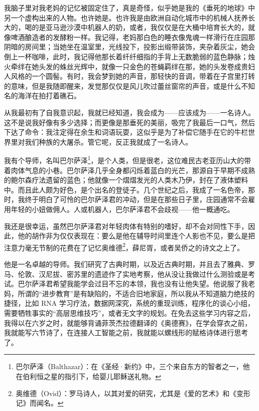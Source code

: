 \documentclass[AutoFakeBold=true]{book}
\begin{document}
我脑子里对我老妈的记忆被固定住了，真是奇怪，似乎她是我的《垂死的地球》中另一个虚构出来的人物。也许她是。也许我是由欧洲自动化城市中的机械人抚养长大的，喝的是亚马逊沙漠中机器人的奶，或者，我仅仅是在大桶中培育长大的，就像啤酒酿造者的发酵粉一样。我记得，老妈那白色的睡衣像鬼魂一样滑行在庄园那阴暗的房间里；当她坐在温室里，光线投下，投影出缎带装饰，夹杂着灰尘，她会倒上一杯咖啡，此时，我记得他那长着纤纤细指的手背上无数脆弱的蓝色静脉；烛火牵绊在她头发的蛛丝光辉中，就像一只金色的苍蝇羁绊在那，她的头发卷成贵妇人风格的一个圆髻。有时，我会梦到她的声音，那轻快的音调，带着在子宫里打转的意味，但是我随即醒来，发觉那仅仅是风儿吹过蕾丝窗帘的声音，或是什么不知名的海洋在拍打着礁石。

从我最初有了自我意识起，我就已经知道，我会成为——应该成为——一名诗人。这不是说我好像有多少选择；而更像是那垂死的美丽，吸完了我最后一口气，然后下达了命令：我注定得在余生和词语玩耍，这似乎是为了补偿它随手在它的牛栏世界里对我们种族的大屠杀。管它呢，反正我就成了一名诗人。

我有个导师，名叫巴尔萨泽\footnote{巴尔萨泽（Balthazar）：在《圣经·新约》中，三个来自东方的智者之一，他在伯利恒之星的指引下，给婴儿耶稣送礼物。}，是个人类，但是很老，这位难民古老亚历山大的带着肉体气息的小巷。巴尔萨泽几乎全身都闪烁着蓝白的光芒，那源自于早期不成熟的鲍尔森疗法遗留的蓝色；他就像一个熠熠发光的人类木乃伊，封在了液体塑料中。而且此人颇为好色，是个出名的登徒子。几个世纪之后，我成了一名色帝，那时，我终于明白了可怜的巴尔萨泽君的冲动，但是在那些日子里，庄园通常不会雇用年轻的小妞做佣人。人或机器人，巴尔萨泽君不会歧视——他一概通吃。

我还是很幸运，虽然巴尔萨泽君对年轻肉体有特别的嗜好，却不会对同性下手，因此，他的胡作非为仅仅表现在：要么是他在辅导时间里连个人影也不见，要么是把注意力毫无节制的花费在了记忆奥维德\footnote{奥维德（Ovid）：罗马诗人，以其对爱的研究，尤其是《爱的艺术》和《变形记》而闻名。}，薛尼胥，或者吴侨之的诗文之上了。

他是一名卓越的导师。我们研究了古典时期，以及近古典时期，并且去了雅典、罗马、伦敦、汉尼拔、密苏里的遗迹作了实地考察，他从没让我做过什么测验或是考试。巴尔萨泽君希望我能学会过目不忘的本领，我也没有让他失望。他说服了我老妈，所谓的``进步教育''是有缺陷的，不适合旧地家庭，所以我从不知道脑力绝技的捷径，比如 RNA 学习疗法，数据网深究，系统的重现训练，程序化的谈心小组，需要牺牲事实的``高层思维技巧''，或者无文字的规划。在免去这些学习内容之后，我得以在六岁之时，就能够背诵菲茨杰拉德翻译的《奥德赛》，在学会穿衣之前，我就能写六节诗了，在连接人工智能之前，我就能以螺线形的赋格诗体进行思考了。
\end{document}
